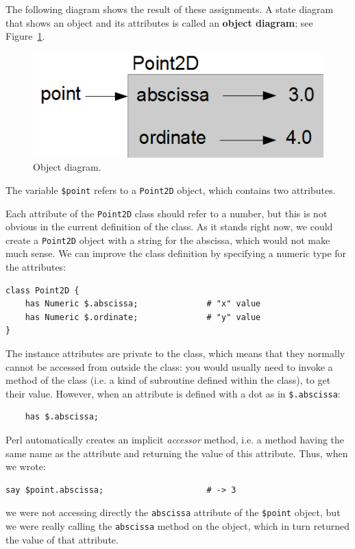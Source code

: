 The following diagram shows the result of these assignments.
A state diagram that shows an object and its attributes is
called an {\bf object diagram}; see Figure~\ref{fig.point2d}.

\begin{figure}
\centerline
{\includegraphics[scale=0.8]{figs/point2D.png}}
\caption{Object diagram.}
\label{fig.point2d}
\end{figure}

The variable {\tt \$point} refers to a {\tt Point2D} object, 
which contains two attributes.  

Each attribute of the {\tt Point2D} class should refer to a 
number, but this is not obvious in the current definition of 
the class. As it stands right now, we could create a {\tt Point2D} 
object with a string for the abscissa, which would not make 
much sense. We can improve the class definition by specifying 
a numeric type for the attributes:
%
\begin{verbatim}
class Point2D {
    has Numeric $.abscissa;              # "x" value
    has Numeric $.ordinate;              # "y" value
}
\end{verbatim}
%
The instance attributes are private to the class, which means 
that they normally cannot be accessed from outside the class: 
you would usually need to invoke a method of the class 
(i.e. a kind of subroutine defined within the class), to get 
their value. However, when an attribute is defined with a dot 
as in \verb'$.abscissa':

\begin{verbatim}
    has $.abscissa;  
\end{verbatim}
%
Perl automatically creates an implicit \emph{accessor} method, 
i.e. a method having the same name as the attribute and returning  
the value of this attribute. Thus, when we wrote:

\begin{verbatim}
say $point.abscissa;                     # -> 3
\end{verbatim}
%
we were not accessing directly the {\tt abscissa} attribute of 
the \verb'$point' object, but we were really calling the 
{\tt abscissa} method on the object, which in turn returned 
the value of that attribute.

